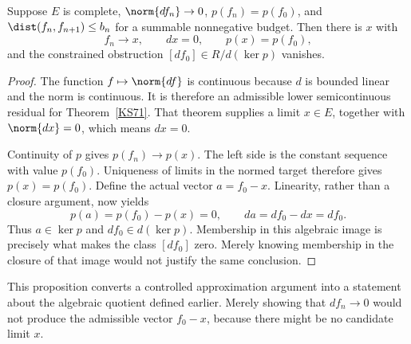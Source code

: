 \begin{proposition}\label{KS73}
Suppose \(E\) is complete, \(\norm{df_n}\to0\), \(p(f_n)=p(f_0)\), and \(\dist(f_n,f_{n+1})\le b_n\) for a summable nonnegative budget. Then there is \(x\) with
\[
 f_n\to x,\qquad dx=0,\qquad p(x)=p(f_0),
\]
and the constrained obstruction \([df_0]\in R/d(\ker p)\) vanishes.
\end{proposition}
\begin{proof}
The function \(f\mapsto\norm{df}\) is continuous because \(d\) is bounded linear and the norm is continuous. It is therefore an admissible lower semicontinuous residual for Theorem~\ref{KS71}. That theorem supplies a limit \(x\in E\), together with \(\norm{dx}=0\), which means \(dx=0\).

Continuity of \(p\) gives \(p(f_n)\to p(x)\). The left side is the constant sequence with value \(p(f_0)\). Uniqueness of limits in the normed target therefore gives \(p(x)=p(f_0)\). Define the actual vector \(a=f_0-x\). Linearity, rather than a closure argument, now yields
\[
 p(a)=p(f_0)-p(x)=0,\qquad da=df_0-dx=df_0.
\]
Thus \(a\in\ker p\) and \(df_0\in d(\ker p)\). Membership in this algebraic image is precisely what makes the class \([df_0]\) zero. Merely knowing membership in the closure of that image would not justify the same conclusion.
\end{proof}
This proposition converts a controlled approximation argument into a statement about the algebraic quotient defined earlier. Merely showing that \(df_n\to0\) would not produce the admissible vector \(f_0-x\), because there might be no candidate limit \(x\).


